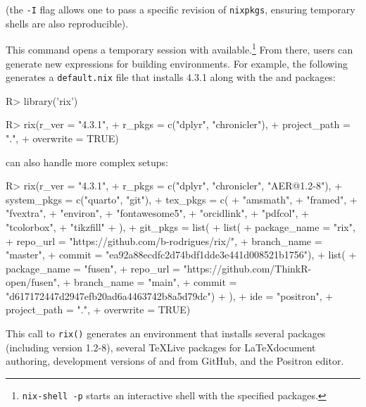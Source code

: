 \documentclass[
  article]{jss}
\begin{document}

(the \texttt{-I} flag allows one to pass a specific revision of
\texttt{nixpkgs}, ensuring temporary shells are also reproducible).

This command opens a temporary \proglang{R} session with \pkg{rix}
available.\footnote{\texttt{nix-shell\ -p} starts an interactive shell
  with the specified packages.} From there, users can generate new
\pkg{Nix} expressions for building environments. For example, the
following generates a \texttt{default.nix} file that installs
\proglang{R} 4.3.1 along with the \pkg{dplyr} and \pkg{chronicler}
packages:

\begin{CodeInput}
R> library('rix')

R> rix(r_ver = "4.3.1",
+    r_pkgs = c("dplyr", "chronicler"),
+    project_path = ".",
+    overwrite = TRUE)
\end{CodeInput}

 can also handle more complex setups:

\begin{CodeInput}
R> rix(r_ver = "4.3.1",
+    r_pkgs = c("dplyr", "chronicler", "AER@1.2-8"),
+    system_pkgs = c("quarto", "git"),
+    tex_pkgs = c(
+          "amsmath",
+          "framed",
+          "fvextra",
+          "environ",
+          "fontawesome5",
+          "orcidlink",
+          "pdfcol",
+          "tcolorbox",
+          "tikzfill"
+    ),
+    git_pkgs = list(
+      list(
+        package_name = "rix",
+        repo_url = "https://github.com/b-rodrigues/rix/",
+        branch_name = "master",
+        commit = "ea92a88ecdfc2d74bdf1dde3e441d008521b1756"),
+      list(
+        package_name = "fusen",
+        repo_url = "https://github.com/ThinkR-open/fusen",
+        branch_name = "main",
+        commit = "d617172447d2947efb20ad6a4463742b8a5d79dc")
+    ),
+    ide = "positron",
+    project_path = ".",
+    overwrite = TRUE)
\end{CodeInput}

This call to \texttt{rix()} generates an environment that installs
several  packages (including  version 1.2-8),
several TeXLive packages for \LaTeX document authoring, development
versions of \pkg{rix} and \pkg{fusen} from GitHub, and the Positron
editor.
\end{document}

